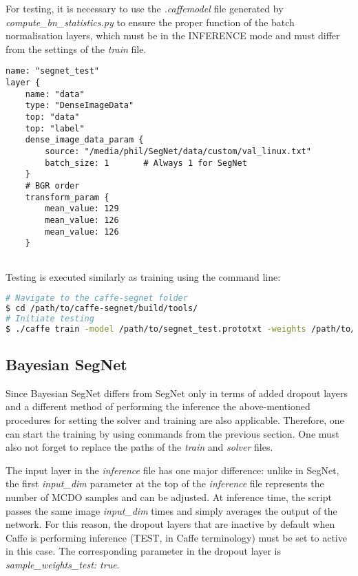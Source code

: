 For testing, it is necessary to use the \textit{.caffemodel} file generated by \textit{compute\_bn\_statistics.py} to ensure the proper function of the batch normalisation layers, which must be in the INFERENCE mode and must differ from the settings of the \textit{train} file.

\begin{lstlisting}[caption={Setting up the input layer of \textit{test.prototxt} \cite{filip_github}},captionpos=b]
name: "segnet_test"
layer {
	name: "data"
	type: "DenseImageData"
	top: "data"
	top: "label"
	dense_image_data_param {
		source: "/media/phil/SegNet/data/custom/val_linux.txt"	
		batch_size: 1		# Always 1 for SegNet
	}
	# BGR order
	transform_param {
		mean_value: 129
		mean_value: 126
		mean_value: 126 
	}  
	
\end{lstlisting}

Testing is executed similarly as training using the command line:

\begin{lstlisting}[language=bash]
# Navigate to the caffe-segnet folder
$ cd /path/to/caffe-segnet/build/tools/
# Initiate testing
$ ./caffe train -model /path/to/segnet_test.prototxt -weights /path/to/final_weights.caffemodel
\end{lstlisting}

\newpage
\subsection{Bayesian SegNet}

Since Bayesian SegNet differs from SegNet only in terms of added dropout layers and a different method of performing the inference the above-mentioned procedures for setting the solver and training are also applicable. Therefore, one can start the training by using commands from the previous section. One must also not forget to replace the paths of the \textit{train} and \textit{solver} files. 

The input layer in the \textit{inference} file has one major difference: unlike in SegNet, the first \textit{input\_dim} parameter at the top of the \textit{inference} file represents the number of MCDO samples and can be adjusted. At inference time, the script passes the same image \textit{input\_dim} times and simply averages the output of the network. For this reason, the dropout layers that are inactive by default when Caffe is performing inference (TEST, in Caffe terminology) must be set to active in this case. The corresponding parameter in the dropout layer is \textit{sample\_weights\_test: true}. 

